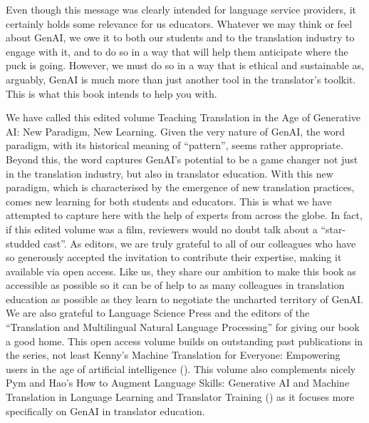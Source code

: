 \documentclass[output=paper]{langscibook}
\begin{document}
Even though this message was clearly intended for language service providers, it certainly holds some relevance for us educators. Whatever we may think or feel about GenAI, we owe it to both our students and to the translation industry to engage with it, and to do so in a way that will help them anticipate where the puck is going. However, we must do so in a way that is ethical and sustainable as, arguably, GenAI is much more than just another tool in the translator’s toolkit. This is what this book intends to help you with.

We have called this edited volume Teaching Translation in the Age of Generative AI: New Paradigm, New Learning. Given the very nature of GenAI, the word paradigm, with its historical meaning of “pattern”, seems rather appropriate. Beyond this, the word captures GenAI’s potential to be a game changer not just in the translation industry, but also in translator education. With this new paradigm, which is characterised by the emergence of new translation practices, comes new learning for both students and educators. This is what we have attempted to capture here with the help of experts from across the globe. In fact, if this edited volume was a film, reviewers would no doubt talk about a “star-studded cast”. As editors, we are truly grateful to all of our colleagues who have so generously accepted the invitation to contribute their expertise, making it available via open access. Like us, they share our ambition to make this book as accessible as possible so it can be of help to as many colleagues in translation education as possible as they learn to negotiate the uncharted territory of GenAI. We are also grateful to Language Science Press and the editors of the “Translation and Multilingual Natural Language Processing” for giving our book a good home. This open access volume builds on outstanding past publications in the series, not least Kenny’s Machine Translation for Everyone: Empowering users in the age of artificial intelligence (\citeyear{kenny2022}). This volume also complements nicely Pym and Hao’s How to Augment Language Skills: Generative AI and Machine Translation in Language Learning and Translator Training (\citeyear{pym_how_2025}) as it focuses more specifically on GenAI in translator education. 
\end{document}
